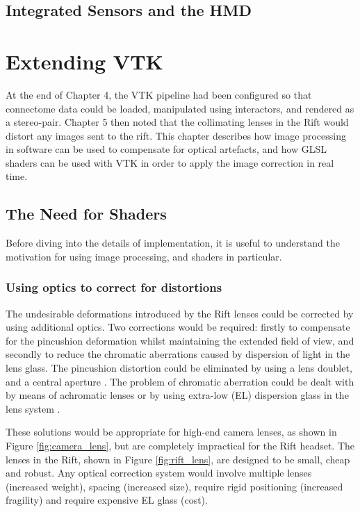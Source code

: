 \documentclass[MSc,paper=a4,pagesize=auto]{icldt}
\begin{document}
\section{Integrated Sensors and the HMD}

\chapter{Extending VTK}
At the end of Chapter 4, the VTK pipeline had been configured so that connectome data could be loaded, manipulated using interactors, and rendered as a stereo-pair. Chapter 5 then noted that the collimating lenses in the Rift would distort any images sent to the rift. This chapter describes how image processing in software can be used to compensate for optical artefacts, and how GLSL shaders can be used with VTK in order to apply the image correction in real time. 

\section{The Need for Shaders}
\label{sec:need_for_shaders}
Before diving into the details of implementation, it is useful to understand the motivation for using image processing, and shaders in particular. 

\subsection{Using optics to correct for distortions}
The undesirable deformations introduced by the Rift lenses could be corrected by using additional optics. Two corrections would be required: firstly to compensate for the pincushion deformation whilst maintaining the extended field of view, and secondly to reduce the chromatic aberrations caused by dispersion of light in the lens glass. The pincushion distortion could be eliminated by using a lens doublet, and a central aperture \cite{Brainerd2004}. The problem of chromatic aberration could be dealt with by means of achromatic lenses or by using extra-low (EL) dispersion glass in the lens system \cite{Davis2014}. 

These solutions would be appropriate for high-end camera lenses, as shown in Figure \ref{fig:camera_lens}, but are completely impractical for the Rift headset. The lenses in the Rift, shown in Figure \ref{fig:rift_lens}, are designed to be small, cheap and robust. Any optical correction system would involve multiple lenses (increased weight), spacing (increased size), require rigid positioning (increased fragility) and require expensive EL glass (cost).
\end{document}
